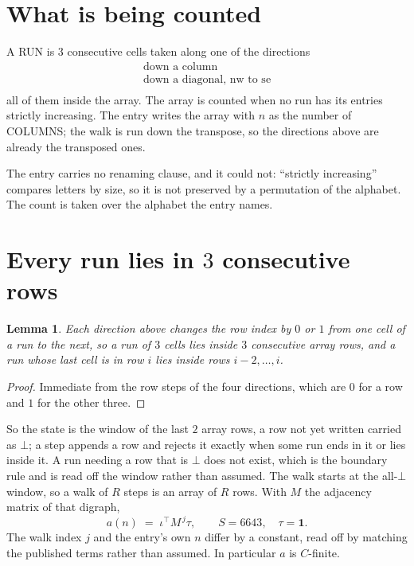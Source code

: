 \documentclass[11pt,a4paper]{article}
\theoremstyle{plain}
\newtheorem{lemma}[theorem]{Lemma}
\theoremstyle{definition}
\begin{document}
\section{What is being counted}

A RUN is $3$ consecutive cells taken along one of the directions
\[
\begin{array}{l}
\text{down a column} \\
\text{down a diagonal, nw to se} \\
\end{array}
\]
all of them inside the array. The array is counted when no run has its entries strictly increasing. The entry writes the array with $n$ as the number of COLUMNS; the walk is run down the transpose, so the directions above are already the transposed ones.


The entry carries no renaming clause, and it could not: ``strictly increasing'' compares
letters by size, so it is not preserved by a permutation of the alphabet. The count is taken
over the alphabet the entry names.

\section{Every run lies in $3$ consecutive rows}

\begin{lemma}\label{lem:win}
Each direction above changes the row index by $0$ or $1$ from one cell of a run to the next, so
a run of $3$ cells lies inside $3$ consecutive array rows, and a run whose last cell is in
row $i$ lies inside rows $i-2,\dots,i$.
\end{lemma}

\begin{proof}
Immediate from the row steps of the four directions, which are $0$ for a row and $1$ for the
other three.
\end{proof}

So the state is the window of the last $2$ array rows, a row not yet written carried as
$\bot$; a step appends a row and rejects it exactly when some run ends in it or lies inside it.
A run needing a row that is $\bot$ does not exist, which is the boundary rule and is read off
the window rather than assumed. The walk starts at the all-$\bot$ window, so a walk of $R$ steps
is an array of $R$ rows. With $M$ the adjacency matrix of that digraph,
\[
a(n)\;=\;\iota^{\!\top}M^{\,j}\tau ,\qquad S=6643,\quad\tau=\mathbf{1} .
\]
The walk index $j$ and the entry's own $n$ differ by a constant, read off by matching the
published terms rather than assumed. In particular $a$ is $C$-finite.
\end{document}
